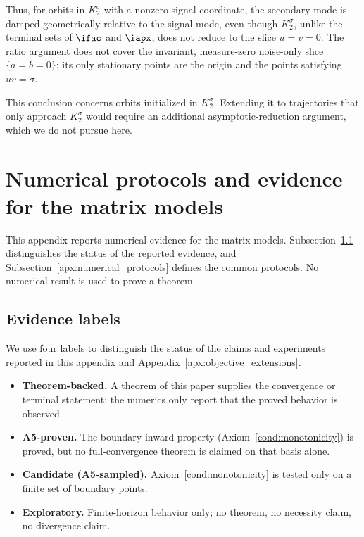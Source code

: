 \documentclass{article}
\begin{document}
Thus, for orbits in $K_2^\sigma$ with a nonzero signal coordinate, the
secondary mode is damped geometrically relative to the signal mode, even
though $K_2^\sigma$, unlike the terminal sets of $\ifac$ and $\iapx$, does not
reduce to the slice $u=v=0$. The ratio argument does not cover the invariant,
measure-zero noise-only slice $\{a=b=0\}$; its only stationary points are the
origin and the points satisfying $uv=\sigma$.

This conclusion concerns orbits initialized in $K_2^\sigma$. Extending it to
trajectories that only approach $K_2^\sigma$ would require an additional
asymptotic-reduction argument, which we do not pursue here.


\section{Numerical protocols and evidence for the matrix models}
\label{apx:numerics}

This appendix reports numerical evidence for the matrix models.
Subsection~\ref{apx:evidence_labels} distinguishes the status of the reported
evidence, and Subsection~\ref{apx:numerical_protocols} defines the common
protocols. No numerical result is used to prove a theorem.

\subsection{Evidence labels}
\label{apx:evidence_labels}

We use four labels to distinguish the status of the claims and experiments
reported in this appendix and Appendix~\ref{apx:objective_extensions}.

\begin{itemize}
    \item \textbf{Theorem-backed.} A theorem of this paper supplies the
    convergence or terminal statement; the numerics only report that the
    proved behavior is observed.
    \item \textbf{A5-proven.} The boundary-inward property
    (Axiom~\ref{cond:monotonicity}) is proved, but no full-convergence theorem
    is claimed on that basis alone.
    \item \textbf{Candidate (A5-sampled).} Axiom~\ref{cond:monotonicity} is
    tested only on a finite set of boundary points.
    \item \textbf{Exploratory.} Finite-horizon behavior only; no theorem, no
    necessity claim, no divergence claim.
\end{itemize}
\end{document}
